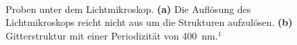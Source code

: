 \begin{figure}%
\centering
	\qquad
	\\%
\caption{Proben unter dem Lichtmikroskop. \textbf{(a)} Die Auflösung des Lichtmikroskops reicht nicht aus um die Strukturen aufzulösen. \textbf{(b)} Gitterstruktur mit einer Periodizität von 400~nm.$^1$}%
\label{fig:matlab}%
\end{figure}



